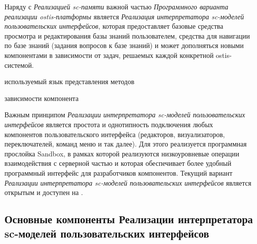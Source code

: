 Наряду с \textit{Реализацией sc-памяти} важной частью \textit{Программного варианта реализации ostis-платформы} является \textit{Реализация интерпретатора sc-моделей пользовательских интерфейсов}, которая предоставляет базовые средства просмотра и редактирования базы знаний пользователем, средства для навигации по базе знаний (задания вопросов к базе знаний) и может дополняться новыми компонентами в зависимости от задач, решаемых каждой конкретной ostis-системой.

\begin{SCn}
	\begin{scnrelfromlist}{используемый язык представления методов}
	\end{scnrelfromlist}
	\begin{scnrelfromset}{зависимости компонента}
	\end{scnrelfromset}
\end{SCn}

Важным принципом \textit{Реализации интерпретатора sc-моделей пользовательских интерфейсов} является простота и однотипность подключения любых компонентов пользовательского интерфейса (редакторов, визуализаторов, переключателей, команд меню и так далее). Для этого реализуется программная прослойка Sandbox, в рамках которой реализуются низкоуровневые операции взаимодействия с серверной частью и которая обеспечивает более удобный программный интерфейс для разработчиков компонентов. Текущий вариант \textit{Реализации интерпретатора sc-моделей пользовательских интерфейсов} является открытым и доступен на \cite{sc-web}.

\subsection{Основные компоненты Реализации интерпретатора sc-моделей пользовательских интерфейсов}
\label{sec_soft_platform_sci_machine_components}

